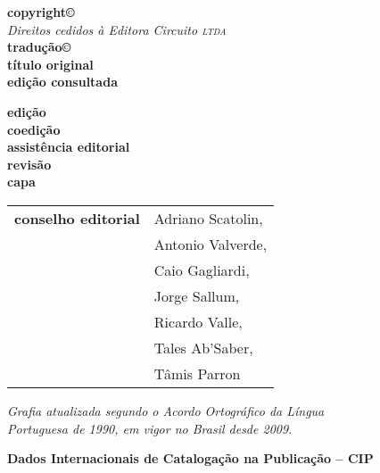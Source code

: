 \newcommand{\linha}[2]{\ifdef{#2}{\linhalayout{#1}{#2}}{}}

\begingroup\tiny
\parindent=0cm
\thispagestyle{empty}

\textbf{copyright©}\\
\mbox{}\qquad\qquad\quad\hspace{4pt} \textit{Direitos cedidos à Editora Circuito \textsc{ltda}}\\
\textbf{tradução©}\\
\textbf{título original}\\
\textbf{edição consultada}

\textbf{edição}\\
\textbf{coedição}\\
\textbf{assistência editorial}\\
\textbf{revisão}\\
\textbf{capa}\\


\hspace{-5pt}\begin{tabular}{ll}
\textbf{conselho editorial} & Adriano Scatolin,  \\
							& Antonio Valverde,  \\
							& Caio Gagliardi,    \\
							& Jorge Sallum,      \\
							& Ricardo Valle,     \\
							& Tales Ab'Saber,    \\
							& Tâmis Parron      
\end{tabular}

\bigskip
 
\textit{Grafia atualizada segundo o Acordo Ortográfico da Língua\\
Portuguesa de 1990, em vigor no Brasil desde 2009.}\\

\bigskip

\noindent\textbf{Dados Internacionais de Catalogação na Publicação -- CIP}

